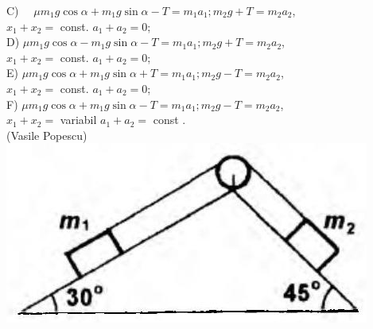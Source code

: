 \documentclass[10pt]{article}
\begin{document}
C) $\quad \mu m_{1} g \cos \alpha+m_{1} g \sin \alpha-T=m_{1} a_{1} ; m_{2} g+T=m_{2} a_{2}$,\\
$x_{1}+x_{2}=$ const. $a_{1}+a_{2}=0$;\\
D) $\mu m_{1} g \cos \alpha-m_{1} g \sin \alpha-T=m_{1} a_{1} ; m_{2} g+T=m_{2} a_{2}$,\\
$x_{1}+x_{2}=$ const. $a_{1}+a_{2}=0$;\\
E) $\mu m_{1} g \cos \alpha+m_{1} g \sin \alpha+T=m_{1} a_{1} ; m_{2} g-T=m_{2} a_{2}$,\\
$x_{1}+x_{2}=$ const. $a_{1}+a_{2}=0$;\\
F) $\mu m_{1} g \cos \alpha+m_{1} g \sin \alpha-T=m_{1} a_{1} ; m_{2} g-T=m_{2} a_{2}$,\\
$x_{1}+x_{2}=$ variabil $a_{1}+a_{2}=$ const .\\
(Vasile Popescu)\\
\includegraphics[max width=\textwidth, center]{2025_07_01_5b3ff9fa0d508c8e9f17g-018}
\end{document}
